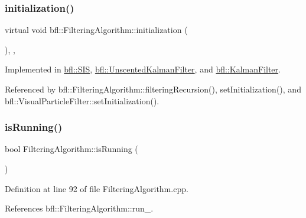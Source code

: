 \subsubsection{\texorpdfstring{initialization()}{initialization()}}
{\footnotesize\ttfamily virtual void bfl\+::\+Filtering\+Algorithm\+::initialization (\begin{DoxyParamCaption}{ }\end{DoxyParamCaption})\hspace{0.3cm}{\ttfamily [protected]}, {}, {\ttfamily [inherited]}}



Implemented in \mbox{\hyperlink{classbfl_1_1SIS_aaf9f4a14d51804eddcd93aa8a5ccbba8}{bfl\+::\+S\+IS}}, \mbox{\hyperlink{classbfl_1_1UnscentedKalmanFilter_acd5cfc6344d9ce24fb980aa22ecf4895}{bfl\+::\+Unscented\+Kalman\+Filter}}, and \mbox{\hyperlink{classbfl_1_1KalmanFilter_a34482fcfad20be0559cea9c060c5f949}{bfl\+::\+Kalman\+Filter}}.



Referenced by bfl\+::\+Filtering\+Algorithm\+::filtering\+Recursion(), set\+Initialization(), and bfl\+::\+Visual\+Particle\+Filter\+::set\+Initialization().

\mbox{\label{classbfl_1_1FilteringAlgorithm_a5cfecab2c778620e2557237472bb1721}} 
\subsubsection{\texorpdfstring{is\+Running()}{isRunning()}}
{\footnotesize\ttfamily bool Filtering\+Algorithm\+::is\+Running (\begin{DoxyParamCaption}{ }\end{DoxyParamCaption})\hspace{0.3cm}{\ttfamily [inherited]}}



Definition at line 92 of file Filtering\+Algorithm.\+cpp.



References bfl\+::\+Filtering\+Algorithm\+::run\+\_\+.

\mbox{\label{classbfl_1_1ParticleFilter_af8a15189f6426c075236dd5e9c9a3107}} 
